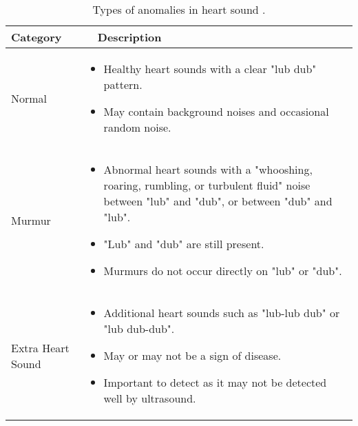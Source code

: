 \begin{table}[t]
\caption{Types of anomalies in heart sound \cite{malik_multi-classification_2022}.}
\begin{tabular}{|p{}|p{}|}
\hline
\centering\textbf{Category} & \ \ \textbf{Description} \\
\hline
\rule{0pt}{4ex} \centering Normal & 
\begin{itemize}
    \vspace{-0.4cm} 
    \item Healthy heart sounds with a clear "lub dub" pattern.
    \item May contain background noises and occasional random noise.
    \vspace{-0.2cm}
\end{itemize} \\
\hline
\rule{0pt}{4ex} \centering Murmur & 
\begin{itemize}
    \vspace{-0.4cm}
    \item Abnormal heart sounds with a "whooshing, roaring, rumbling, or turbulent fluid" noise between "lub" and "dub", or between "dub" and "lub".
    \item "Lub" and "dub" are still present.
    \item Murmurs do not occur directly on "lub" or "dub".
    \vspace{-0.2cm}
\end{itemize} \\
\hline
\rule{0pt}{4ex} \centering Extra Heart Sound & 
\begin{itemize}
    \vspace{-0.4cm}
    \item Additional heart sounds such as "lub-lub dub" or "lub dub-dub".
    \item May or may not be a sign of disease.
    \item Important to detect as it may not be detected well by ultrasound.
    \vspace{-0.2cm}
\end{itemize} \\

\end{tabular}
\end{table}
